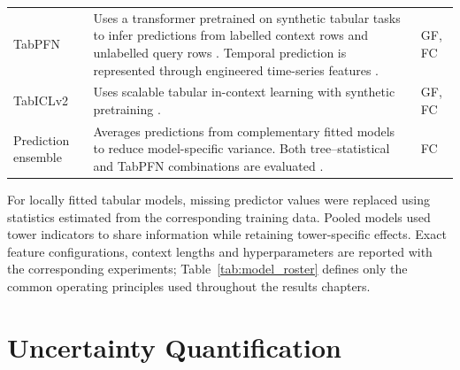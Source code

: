 {\begin{longtable}{
  @{}
  >{\raggedright\arraybackslash}p{}
  >{\raggedright\arraybackslash}p{}
  >{\raggedright\arraybackslash}p{}
  @{}
  }
  TabPFN &
  Uses a transformer pretrained on synthetic tabular tasks to infer predictions
  from labelled context rows and unlabelled query rows
  \cite{hollmann2023tabpfn,hollmann2025tabpfn}. Temporal prediction is represented
  through engineered time-series features \cite{hoo2026tabpfnts}. &
  GF, FC \\

  TabICLv2 &
  Uses scalable tabular in-context learning with synthetic pretraining
  \cite{qu2025tabicl,qu2026tabiclv2}. &
  GF, FC \\

  Prediction ensemble &
  Averages predictions from complementary fitted models to reduce
  model-specific variance. Both tree--statistical and TabPFN combinations are
  evaluated \cite{bates1969combination}. &
  FC \\

  \end{longtable}
  }

For locally fitted tabular models, missing predictor values were replaced using
statistics estimated from the corresponding training data. Pooled models used
tower indicators to share information while retaining tower-specific effects.
Exact feature configurations, context lengths and hyperparameters are reported
with the corresponding experiments; Table~\ref{tab:model_roster} defines only 
the common operating principles used throughout the results chapters.





\section{Uncertainty Quantification}
\label{sec:uncertainty_methods}

